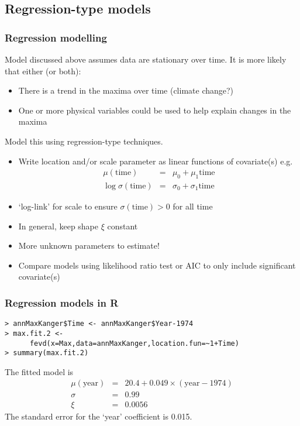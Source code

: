 \documentclass[dvipsnames]{beamer}
\begin{document}
\subsection{Regression-type models}

\begin{frame}
\frametitle{Regression modelling}
Model discussed above assumes data are stationary over time. It is more likely that either (or both):
\begin{itemize}
\item
There is a trend in the maxima over time (climate change?)
\item
One or more physical variables could be used to help explain changes in the maxima
\end{itemize}
Model this using regression-type techniques.
\end{frame}

\begin{frame}
\begin{itemize}
\item
Write location and/or scale parameter as linear functions of covariate(s) e.g.
\begin{eqnarray*}
\mu(\mathrm{time})&=&\mu_0+\mu_1\mathrm{time}\\
\log\sigma(\mathrm{time})&=&\sigma_0+\sigma_1\mathrm{time}
\end{eqnarray*}
\item
`log-link' for scale to ensure $\sigma(\mathrm{time})>0$ for all time
\item
In general, keep shape $\xi$ constant
\item
More unknown parameters to estimate!
\item
Compare models using likelihood ratio test or AIC to only include significant covariate(s)
\end{itemize}
\end{frame}

\begin{frame}[fragile]
\frametitle{Regression models in \textsf{R}}
\begin{verbatim}
> annMaxKanger$Time <- annMaxKanger$Year-1974
> max.fit.2 <- 
      fevd(x=Max,data=annMaxKanger,location.fun=~1+Time)
> summary(max.fit.2)
\end{verbatim}

The fitted model is 
\begin{eqnarray*}
\mu(\mathrm{year})&=&20.4+0.049\times(\mathrm{year}-1974)\\
\sigma&=&0.99\\
\xi&=&0.0056
\end{eqnarray*}
The standard error for the `year' coefficient is 0.015.
\end{frame}
\end{document}
